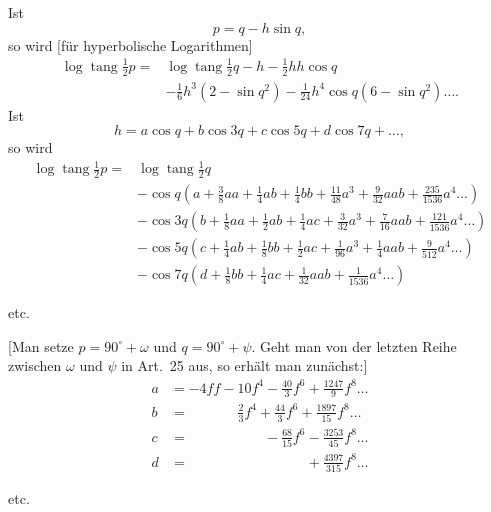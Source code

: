 \bigskip
{\centering [31.]\par{}\par}
Ist
\[p=q-h\sin q,\]
\noindent so wird [für hyperbolische Logarithmen]
\[
\begin{aligned}
\log\operatorname{tang}\tfrac12p={}&\log\operatorname{tang}\tfrac12q-h-\tfrac12hh\cos q\\
&-\tfrac16h^3(2-\sin q^2)-\tfrac1{24}h^4\cos q(6-\sin q^2)\ldots.
\end{aligned}
\]
Ist
\[h=a\cos q+b\cos3q+c\cos5q+d\cos7q+\ldots,\]
\noindent so wird
\[
\begin{aligned}
\log\operatorname{tang}\tfrac12p={}&\log\operatorname{tang}\tfrac12q\\
&-\cos q\left(a+\tfrac38aa+\tfrac14ab+\tfrac14bb+\tfrac{11}{48}a^3+\tfrac9{32}aab+\tfrac{235}{1536}a^4\ldots\right)\\
&-\cos3q\left(b+\tfrac18aa+\tfrac12ab+\tfrac14ac+\tfrac3{32}a^3+\tfrac7{16}aab+\tfrac{121}{1536}a^4\ldots\right)\\
&-\cos5q\left(c+\tfrac14ab+\tfrac18bb+\tfrac12ac+\tfrac1{96}a^3+\tfrac14aab+\tfrac9{512}a^4\ldots\right)\\
&-\cos7q\left(d+\tfrac18bb+\tfrac14ac+\tfrac1{32}aab+\tfrac1{1536}a^4\ldots\right)
\end{aligned}
\]
{\centering etc.\par}
[Man setze \(p=90^\circ+\omega\) und \(q=90^\circ+\psi\). Geht man von der letzten Reihe zwischen \(\omega\) und \(\psi\) in Art.~25 aus, so erhält man zunächst:]
\[
\begin{aligned}
a&=-4ff-10f^4-\frac{40}{3}f^6+\frac{1247}{9}f^8\ldots\\
b&=\phantom{-4ff-}\frac23f^4+\frac{44}{3}f^6+\frac{1897}{15}f^8\ldots\\
c&=\phantom{-4ff-10f^4}-\frac{68}{15}f^6-\frac{3253}{45}f^8\ldots\\
d&=\phantom{-4ff-10f^4-\frac{40}{3}f^6}+\frac{4397}{315}f^8\ldots
\end{aligned}
\]
{\centering etc.\par}
